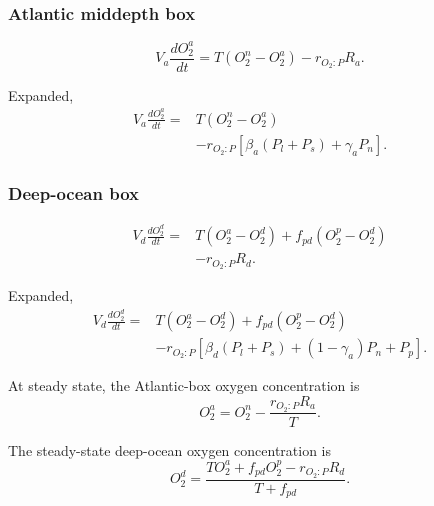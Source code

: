 \documentclass[11pt]{article}
\begin{document}
\subsubsection{Atlantic middepth box}

\begin{equation}
V_a\frac{dO_2^a}{dt}
=
T
\left(
O_2^n-O_2^a
\right)
-
r_{O_2:P}R_a.
\label{eq:seven_o2_a}
\end{equation}

Expanded,
\begin{equation}
\begin{split}
V_a\frac{dO_2^a}{dt}
={}&
T
\left(
O_2^n-O_2^a
\right)
\\
&-
r_{O_2:P}
\left[
\beta_a
\left(
P_l+P_s
\right)
+
\gamma_aP_n
\right].
\end{split}
\label{eq:seven_o2_a_expanded}
\end{equation}

\subsubsection{Deep-ocean box}

\begin{equation}
\begin{split}
V_d\frac{dO_2^d}{dt}
={}&
T
\left(
O_2^a-O_2^d
\right)
+
f_{pd}
\left(
O_2^p-O_2^d
\right)
\\
&-
r_{O_2:P}R_d.
\end{split}
\label{eq:seven_o2_d}
\end{equation}

Expanded,
\begin{equation}
\begin{split}
V_d\frac{dO_2^d}{dt}
={}&
T
\left(
O_2^a-O_2^d
\right)
+
f_{pd}
\left(
O_2^p-O_2^d
\right)
\\
&-
r_{O_2:P}
\left[
\beta_d
\left(
P_l+P_s
\right)
+
\left(1-\gamma_a\right)P_n
+
P_p
\right].
\end{split}
\label{eq:seven_o2_d_expanded}
\end{equation}

At steady state, the Atlantic-box oxygen concentration is
\begin{equation}
O_2^a
=
O_2^n
-
\frac{r_{O_2:P}R_a}{T}.
\label{eq:seven_o2_a_steady}
\end{equation}

The steady-state deep-ocean oxygen concentration is
\begin{equation}
O_2^d
=
\frac{
T O_2^a
+
f_{pd}O_2^p
-
r_{O_2:P}R_d
}{
T+f_{pd}
}.
\label{eq:seven_o2_d_steady}
\end{equation}
\end{document}
